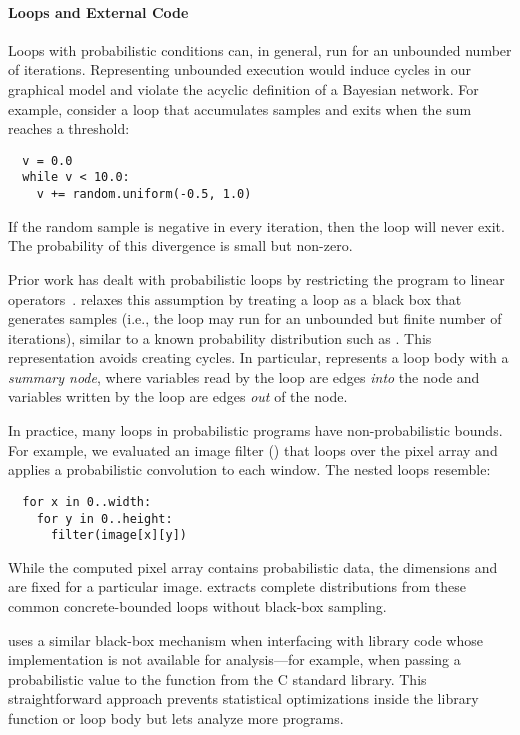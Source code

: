 \label{sec:loops}


\paragraph{Loops and External Code}
Loops with probabilistic conditions can, in general, run for an
unbounded number of iterations. Representing unbounded execution would
induce cycles in our graphical
model and violate the acyclic definition of a Bayesian network. For
example, consider a loop that accumulates samples and exits when the
sum reaches a threshold:
%
\begin{lstlisting}
  v = 0.0
  while v < 10.0:
    v += random.uniform(-0.5, 1.0)
\end{lstlisting}
%
If the random sample is negative in every iteration, then the
loop will never exit. The probability of this divergence is small but non-zero.

Prior work has dealt with probabilistic loops by restricting the program
to linear operators~\cite{sriram-pldi}. \tool relaxes this
assumption by treating a loop as a
black box that generates samples (i.e., the loop may run for an
unbounded but finite number of iterations), similar to a known
probability distribution such as .
This representation avoids creating cycles.
In particular, \tool represents a loop body with a
\emph{summary node}, where variables read by the loop are
edges \emph{into} the node and variables written by the loop are edges \emph{out} of the node.

In practice, many loops in probabilistic programs have
non-probabilistic bounds. For example, we evaluated an image filter
() that loops over the pixel array and applies a probabilistic
convolution to each window. The nested loops resemble:
%
\begin{lstlisting}
  for x in 0..width:
    for y in 0..height:
      filter(image[x][y])
\end{lstlisting}
%
While the computed pixel array contains probabilistic data, the dimensions
 and  are fixed
for a particular image. \tool extracts complete distributions from these common
concrete-bounded loops without black-box sampling.

\tool uses a similar black-box mechanism when interfacing with library code whose
implementation is not available for analysis---for example, when passing a
probabilistic value to the  function from the C standard library.
This straightforward approach prevents statistical optimizations inside the
library function or loop body but lets \tool analyze more programs.

